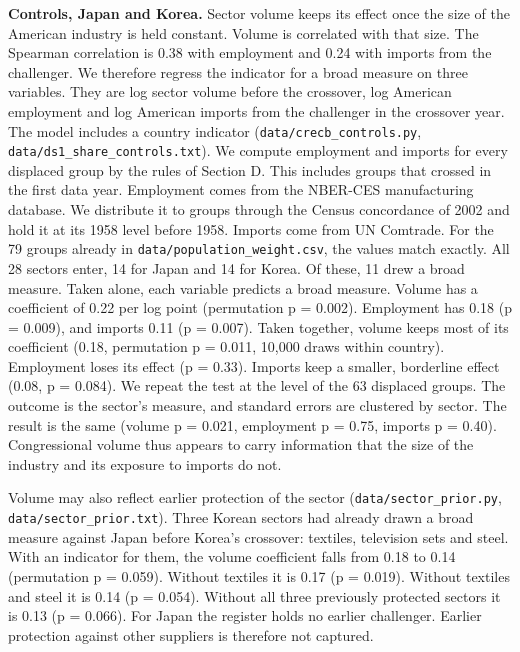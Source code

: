 \textbf{Controls, Japan and Korea.} Sector volume keeps its effect once
the size of the American industry is held constant. Volume is correlated
with that size. The Spearman correlation is 0.38 with employment and
0.24 with imports from the challenger. We therefore regress the
indicator for a broad measure on three variables. They are log sector
volume before the crossover, log American employment and log American
imports from the challenger in the crossover year. The model includes a
country indicator (\texttt{data/\allowbreak{}crecb\_\allowbreak{}controls.py},
\texttt{data/\allowbreak{}ds1\_\allowbreak{}share\_\allowbreak{}controls.txt}). We compute employment and
imports for every displaced group by the rules of Section D. This
includes groups that crossed in the first data year. Employment comes
from the NBER-CES manufacturing database. We distribute it to groups
through the Census concordance of 2002 and hold it at its 1958 level
before 1958. Imports come from UN Comtrade. For the 79 groups already in
\texttt{data/\allowbreak{}population\_\allowbreak{}weight.csv}, the values match exactly. All 28
sectors enter, 14 for Japan and 14 for Korea. Of these, 11 drew a broad
measure. Taken alone, each variable predicts a broad measure. Volume has
a coefficient of 0.22 per log point (permutation p = 0.002). Employment
has 0.18 (p = 0.009), and imports 0.11 (p = 0.007). Taken together,
volume keeps most of its coefficient (0.18, permutation p = 0.011,
10,000 draws within country). Employment loses its effect (p = 0.33).
Imports keep a smaller, borderline effect (0.08, p = 0.084). We repeat
the test at the level of the 63 displaced groups. The outcome is the
sector's measure, and standard errors are clustered by sector. The
result is the same (volume p = 0.021, employment p = 0.75, imports p =
0.40). Congressional volume thus appears to carry information that the
size of the industry and its exposure to imports do not.

Volume may also reflect earlier protection of the sector
(\texttt{data/\allowbreak{}sector\_\allowbreak{}prior.py}, \texttt{data/\allowbreak{}sector\_\allowbreak{}prior.txt}). Three
Korean sectors had already drawn a broad measure against Japan before
Korea's crossover: textiles, television sets and steel. With an
indicator for them, the volume coefficient falls from 0.18 to 0.14
(permutation p = 0.059). Without textiles it is 0.17 (p = 0.019).
Without textiles and steel it is 0.14 (p = 0.054). Without all three
previously protected sectors it is 0.13 (p = 0.066). For Japan the
register holds no earlier challenger. Earlier protection against other
suppliers is therefore not captured.

